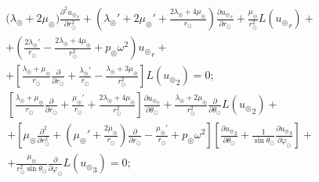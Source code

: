 \begin{equation}\label{eq_1.1}
\begin{split}
\biggl(\lambda_\circledcirc+2\mu_\circledcirc\biggr)\frac{\partial^2 {u_\circledcirc}_r}{\partial r_\odot^2} + \left(\lambda_\circledcirc'+2\mu_\circledcirc'+\frac{2\lambda_\circledcirc+4\mu_\circledcirc}{r_\odot}\right)\frac{\partial {u_\circledcirc}_r}{\partial r_\odot} + \frac{\mu_\circledcirc}{r_\odot^2}L({u_\circledcirc}_r) +\\
+ \left(\frac{2\lambda_\circledcirc'}{r_\odot} - \frac{2\lambda_\circledcirc+4\mu_\circledcirc}{r_\odot^2} + p_\circledcirc\omega^2\right){u_\circledcirc}_r +\\
+ \left[\frac{\lambda_\circledcirc+\mu_\circledcirc}{r_\odot}\frac{\partial}{\partial r_\odot} + \frac{\lambda_\circledcirc'}{r_\odot} - \frac{\lambda_\circledcirc+3\mu_\circledcirc}{r_\odot^2}\right]L({u_\circledcirc}_2) = 0;
\end{split}
\end{equation}
\begin{equation}\label{eq_2.1}
\begin{split}
\left[\frac{\lambda_\circledcirc+\mu_\circledcirc}{r_\odot}\frac{\partial}{\partial r_\odot}+\frac{\mu_\circledcirc'}{r_\odot}+\frac{2\lambda_\circledcirc+4\mu_\circledcirc}{r_\odot^2}\right]\frac{\partial{u_\circledcirc}_r}{\partial \theta_\odot} + \frac{\lambda_\circledcirc+2\mu_\circledcirc}{r_\odot^2}\frac{\partial}{\partial \theta_\odot}L({u_\circledcirc}_2) + \\
+ \left[\mu_\circledcirc\frac{\partial^2}{\partial r_\odot^2} + \left(\mu_\circledcirc'+\frac{2\mu_\circledcirc}{r_\odot}\right)\frac{\partial}{\partial r_\odot} - \frac{\mu_\circledcirc'}{r_\odot} + p_\circledcirc\omega^2\right]\left[\frac{\partial {u_\circledcirc}_2}{\partial\theta_\odot} + \frac{1}{\sin\theta_\odot}\frac{\partial{u_\circledcirc}_3}{\partial\varphi_\odot}\right]+\\
+ \frac{\mu_\circledcirc}{r_\odot^2\sin\theta_\odot}\frac{\partial}{\partial\varphi_\odot}L({u_\circledcirc}_3) = 0;
\end{split}
\end{equation}
